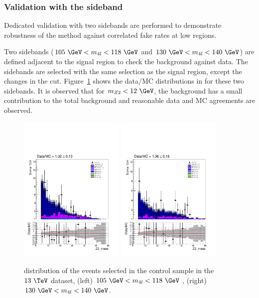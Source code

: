 \subsubsection{Validation with the \mass{4\ell} sideband}
Dedicated validation with two sidebands are performed to demonstrate robustness of the method against correlated fake 
rates at low  regions.

Two \mass{4\ell} sidebands ($105~\GeV < \mass{4l} < 118~\GeV$ and $130~\GeV < \mass{4l} < 140~\GeV$) are defined adjacent 
to the signal region to check the \zx background against data. The \mass{4\ell} sidebands are selected with the same selection 
as the signal region, except the changes in the \mass{4\ell} cut. Figure~\ref{fig:m4l_SB} shows the data/MC distributions in 
 for these two sidebands. It is observed that for $\mass{Z2} < 12~\GeV$, the \zx background has a small contribution 
to the total background and reasonable data and MC agreements are observed.

\begin{figure}[!htb]
\begin{center}
    {\includegraphics [width=0.45\textwidth] {Figures/RedBkg/m4lSB/Z2_mass_m4l105To118}}
    {\includegraphics [width=0.45\textwidth] {Figures/RedBkg/m4lSB/Z2_mass_m4l130To140}} \\
\caption{
     distribution of the events selected in the \mass{4\ell} control sample in the
    $13~\TeV$ dataset, (left)  $105~\GeV < \mass{4l} < 118~\GeV$ , (right) $130~\GeV < \mass{4l} < 140~\GeV$.
}
\label{fig:m4l_SB}
\end{center}
\end{figure}

